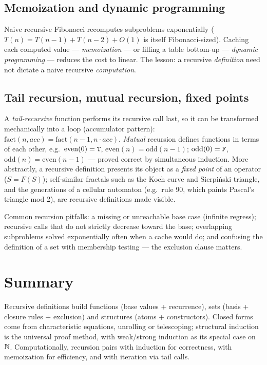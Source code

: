 \subsection{Memoization and dynamic programming}

Naive recursive Fibonacci recomputes subproblems exponentially
($T(n) = T(n-1) + T(n-2) + O(1)$ is itself Fibonacci-sized). Caching each
computed value --- \emph{memoization} --- or filling a table bottom-up ---
\emph{dynamic programming} --- reduces the cost to linear. The lesson:
a recursive \emph{definition} need not dictate a naive recursive
\emph{computation}.

\subsection{Tail recursion, mutual recursion, fixed points}

A \emph{tail-recursive} function performs its recursive call last, so it
can be transformed mechanically into a loop (accumulator pattern):
$\mathrm{fact}(n, acc) = \mathrm{fact}(n-1, n \cdot acc)$. \emph{Mutual}
recursion defines functions in terms of each other, e.g.\
$\mathrm{even}(0) = \mathtt{T}$, $\mathrm{even}(n) = \mathrm{odd}(n-1)$;
$\mathrm{odd}(0) = \mathtt{F}$, $\mathrm{odd}(n) = \mathrm{even}(n-1)$ ---
proved correct by simultaneous induction. More abstractly, a recursive
definition presents its object as a \emph{fixed point} of an operator
($S = F(S)$); self-similar fractals such as the Koch curve and
Sierpi\'nski triangle, and the generations of a cellular automaton (e.g.\
rule 90, which paints Pascal's triangle mod 2), are recursive definitions
made visible.

\begin{notebox}
Common recursion pitfalls: a missing or unreachable base case (infinite
regress); recursive calls that do not strictly decrease toward the base;
overlapping subproblems solved exponentially often when a cache would do;
and confusing the definition of a set with membership testing --- the
exclusion clause matters.
\end{notebox}

\section{Summary}

Recursive definitions build functions (base values + recurrence), sets
(basis + closure rules + exclusion) and structures (atoms + constructors).
Closed forms come from characteristic equations, unrolling or telescoping;
structural induction is the universal proof method, with weak/strong
induction as its special case on $\mathbb{N}$. Computationally, recursion pairs
with induction for correctness, with memoization for efficiency, and with
iteration via tail calls.

